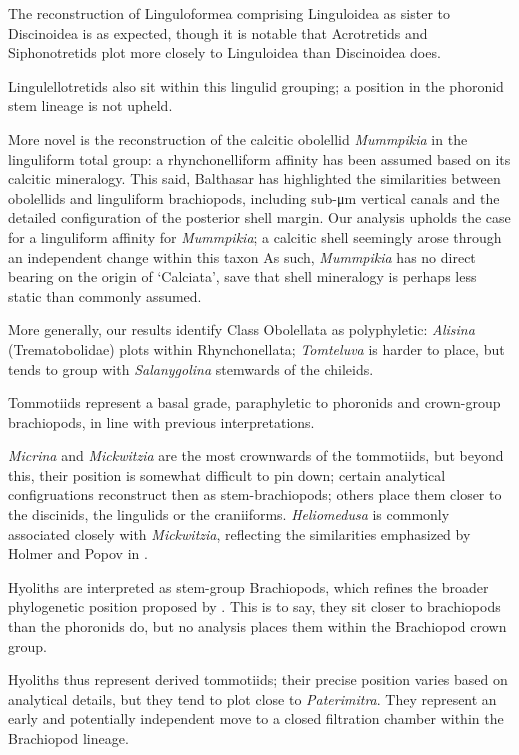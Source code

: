 \documentclass[]{book}
\providecommand{\tightlist}{%
  \setlength{\itemsep}{0pt}\setlength{\parskip}{0pt}}
\theoremstyle{definition}
\theoremstyle{definition}
\theoremstyle{definition}
\theoremstyle{remark}
\begin{document}
\begin{description}
\tightlist
\item[Linguliforms]
The reconstruction of Linguloformea comprising Linguloidea as sister to
Discinoidea is as expected, though it is notable that Acrotretids and
Siphonotretids plot more closely to Linguloidea than Discinoidea does.

Lingulellotretids also sit within this lingulid grouping; a position in
the phoronid stem lineage \citep[advocated
by][]{Balthasar2009EarlyCambrian} is not upheld.

More novel is the reconstruction of the calcitic obolellid
\emph{Mummpikia} in the linguliform total group: a rhynchonelliform
affinity has been assumed based on its calcitic mineralogy. This said,
Balthasar \citeyearpar{Balthasar2008iMummpikia} has highlighted the
similarities between obolellids and linguliform brachiopods, including
sub-μm vertical canals and the detailed configuration of the posterior
shell margin. Our analysis upholds the case for a linguliform affinity
for \emph{Mummpikia}; a calcitic shell seemingly arose through an
independent change within this taxon As such, \emph{Mummpikia} has no
direct bearing on the origin of `Calciata', save that shell mineralogy
is perhaps less static than commonly assumed.

More generally, our results identify Class Obolellata as polyphyletic:
\emph{Alisina} (Trematobolidae) plots within Rhynchonellata;
\emph{Tomteluva} is harder to place, but tends to group with
\emph{Salanygolina} stemwards of the chileids.
\item[Tommotiids]
Tommotiids represent a basal grade, paraphyletic to phoronids and
crown-group brachiopods, in line with previous interpretations.

\emph{Micrina} and \emph{Mickwitzia} are the most crownwards of the
tommotiids, but beyond this, their position is somewhat difficult to pin
down; certain analytical configruations reconstruct then as
stem-brachiopods; others place them closer to the discinids, the
lingulids or the craniiforms. \emph{Heliomedusa} is commonly associated
closely with \emph{Mickwitzia}, reflecting the similarities emphasized
by Holmer and Popov in \citet{Williams2007PartH}.
\item[Hyoliths]
Hyoliths are interpreted as stem-group Brachiopods, which refines the
broader phylogenetic position proposed by
\citet{Moysiuk2017Hyolithsare}. This is to say, they sit closer to
brachiopods than the phoronids do, but no analysis places them within
the Brachiopod crown group.

Hyoliths thus represent derived tommotiids; their precise position
varies based on analytical details, but they tend to plot close to
\emph{Paterimitra}. They represent an early and potentially independent
move to a closed filtration chamber within the Brachiopod lineage.
\end{description}


\end{document}
